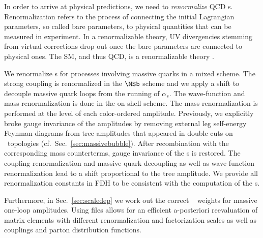 In order to arrive at physical predictions, we need to
\textit{renormalize} QCD \ola s. Renormalization refers to the process of
connecting the initial Lagrangian parameters, so called bare
parameters, to physical quantities that can be measured in experiment. In a renormalizable theory, UV divergencies stemming from
virtual corrections drop out once the bare parameters are connected to
physical ones. The SM, and thus QCD, is a renormalizable theory \cite{tHooft:1971qjg,tHooft:1972tcz}.


We renormalize \ola s for processes involving massive quarks in a
mixed scheme. The strong coupling is renormalized in the
$\MSb$ scheme
and we apply a shift to decouple massive quark loops from the running of
$\alpha_s$. The wave-function and mass renormalization is done in the
on-shell scheme. The mass renormalization is performed at the
level of each color-ordered amplitude. Previously, we explicitly broke gauge invariance of the amplitudes by
removing external leg self-energy Feynman diagrams from tree
amplitudes that appeared in double cuts on \olb~topologies
(cf.~Sec.~\ref{sec:massivebubble}). After recombination with the corresponding mass counterterms, gauge
invariance of the \ola s is restored. The coupling renormalization and massive quark
decoupling as well as wave-function renormalization lead to a shift proportional to the tree amplitude. We provide all renormalization constants in FDH to
be consistent with the computation of the \ola s. 

Furthermore, in Sec.~\ref{sec:scaledep} we work out the correct \root~\cite{ROOT} \ntuple{} weights \cite{BH:Ntuples} for massive
one-loop amplitudes. Using \ntuple{} files allows for an efficient a-posteriori reevaluation of
matrix elements with different renormalization and factorization
scales as well as couplings and parton distribution functions.

